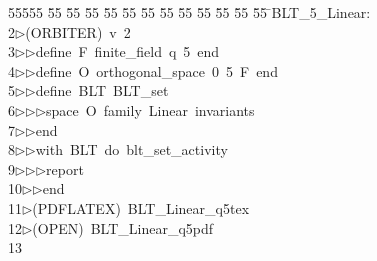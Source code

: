 %
%
\begin{tabbing}
55555 \= 55 \= 55 \= 55 \= 55 \= 55 \= 55 \= 55 \= 55 \= 55 \= 55 \= 55 \= 55 \= \>BLT\_5\_Linear:\\[0pt]
2\>$\triangleright$\>(ORBITER)\ v\ 2\ \\[0pt]
3\>$\triangleright$\>$\triangleright$\>define\ F\ finite\_field\ q\ 5\ end\ \\[0pt]
4\>$\triangleright$\>$\triangleright$\>define\ O\ orthogonal\_space\ 0\ 5\ F\ end\ \\[0pt]
5\>$\triangleright$\>$\triangleright$\>define\ BLT\ BLT\_set\ \\[0pt]
6\>$\triangleright$\>$\triangleright$\>$\triangleright$\>space\ O\ family\ Linear\ invariants\ \\[0pt]
7\>$\triangleright$\>$\triangleright$\>end\ \\[0pt]
8\>$\triangleright$\>$\triangleright$\>with\ BLT\ do\ blt\_set\_activity\ \\[0pt]
9\>$\triangleright$\>$\triangleright$\>$\triangleright$\>report\ \\[0pt]
10\>$\triangleright$\>$\triangleright$\>end\\[0pt]
11\>$\triangleright$\>(PDFLATEX)\ BLT\_Linear\_q5tex\\[0pt]
12\>$\triangleright$\>(OPEN)\ BLT\_Linear\_q5pdf\\[0pt]
13\>\end{tabbing}
